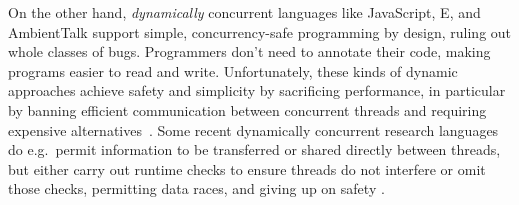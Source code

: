 %
%
%
%

On the other hand,
\textit{dynamically} concurrent languages like
JavaScript\cite{JSVAts},
E\cite{MillerPhD}, and
AmbientTalk\cite{AmbientTalk} support simple,
concurrency-safe programming by design, ruling out whole classes of
bugs.
Programmers don't need to annotate their code,
making programs easier to read and write.
Unfortunately, these kinds of dynamic approaches achieve safety and simplicity
by sacrificing performance, in particular by banning efficient
communication between concurrent threads and requiring
expensive alternatives~\cite{destructive-read,CASTEGREN2018130,JSproxies,AmbientTalk}.
Some recent dynamically concurrent research languages do e.g.\ permit
information to be transferred or shared directly between threads,
but either carry out runtime checks to ensure threads do not interfere
\cite{Daloze2016,Daloze2018}
or omit those checks, permitting data races, and giving up on safety
\cite{GoConcurBugs2019,raffi2020}.




